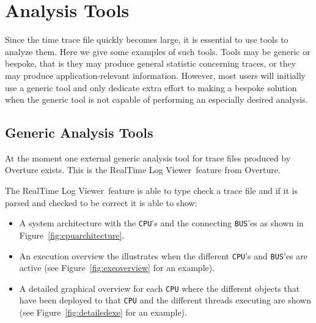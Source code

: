 \documentclass{overturerepchap}
\newcommand{\showtrace}{RealTime Log Viewer}
\begin{document}
\section{Analysis Tools}

Since the time trace file quickly becomes large, it is essential to
use tools to analyze them. Here we give some examples of such
tools. Tools may be generic or bespoke, that is they may produce
general statistic concerning traces, or they may produce
application-relevant information. However, most users will initially
use a generic tool and only dedicate extra effort to making a bespoke
solution when the generic tool is not capable of performing an especially
desired analysis.

\subsection{Generic Analysis Tools}

At the moment one external generic analysis tool for trace files produced by
Overture exists. This is the \showtrace\ feature from Overture.

The \showtrace\ feature is able to type check a trace file and if it 
is parsed and checked to be correct it is able to show:

\begin{itemize}
\item A system architecture with the \texttt{CPU}'s and the connecting
      \texttt{BUS}'es as shown in Figure~\ref{fig:cpuarchitecture}.
\item An execution overview the illustrates when the different 
      \texttt{CPU}'s and \texttt{BUS}'es are active (see 
      Figure~\ref{fig:exeoverview} for an example).
\item A detailed graphical overview for each \texttt{CPU} where the
      different objects that have been deployed to that \texttt{CPU} and
      the different threads executing are shown (see 
      Figure~\ref{fig:detailedexe} for an example).
\end{itemize}
\end{document}
